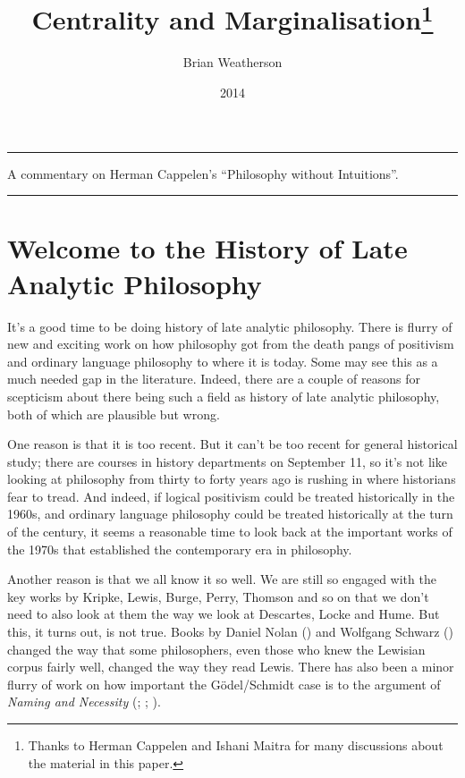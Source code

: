 \documentclass[
  10pt,
  letterpaper,
  DIV=11,
  numbers=noendperiod,
  twoside]{scrartcl}
\title{Centrality and Marginalisation\thanks{Thanks to Herman Cappelen
and Ishani Maitra for many discussions about the material in this
paper.}}
\author{Brian Weatherson}
\date{2014}
\renewenvironment{abstract}
 {\vspace{-1.25cm}
 \quotation\small\noindent\rule{\linewidth}{.5pt}\par\smallskip
 \noindent }
 {\par\noindent\rule{\linewidth}{.5pt}\endquotation}
\begin{document}
\maketitle
\begin{abstract}
A commentary on Herman Cappelen's ``Philosophy without Intuitions''.
\end{abstract}


\section{Welcome to the History of Late Analytic
Philosophy}\label{sec-Intro}

It's a good time to be doing history of late analytic philosophy. There
is flurry of new and exciting work on how philosophy got from the death
pangs of positivism and ordinary language philosophy to where it is
today. Some may see this as a much needed gap in the literature. Indeed,
there are a couple of reasons for scepticism about there being such a
field as history of late analytic philosophy, both of which are
plausible but wrong.

One reason is that it is too recent. But it can't be too recent for
general historical study; there are courses in history departments on
September 11, so it's not like looking at philosophy from thirty to
forty years ago is rushing in where historians fear to tread. And
indeed, if logical positivism could be treated historically in the
1960s, and ordinary language philosophy could be treated historically at
the turn of the century, it seems a reasonable time to look back at the
important works of the 1970s that established the contemporary era in
philosophy.

Another reason is that we all know it so well. We are still so engaged
with the key works by Kripke, Lewis, Burge, Perry, Thomson and so on
that we don't need to also look at them the way we look at Descartes,
Locke and Hume. But this, it turns out, is not true. Books by Daniel
Nolan () and Wolfgang Schwarz
() changed the way that some
philosophers, even those who knew the Lewisian corpus fairly well,
changed the way they read Lewis. There has also been a minor flurry of
work on how important the Gödel/Schmidt case is to the argument of
\emph{Naming and Necessity} (;
;
).
\end{document}
